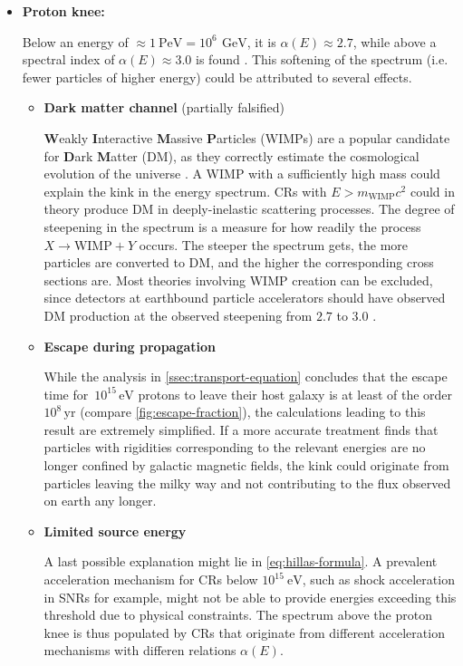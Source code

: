 \begin{itemize}
\item \textbf{Proton knee:}

Below an energy of $\approx \SI{1}{\peta\electronvolt} = 10^6\,\SI{}{\giga\electronvolt}$, it is $\alpha(E)\approx 2.7$, while above a spectral index of 
$\alpha(E)\approx 3.0$ is found \cite{gaisser2016cosmic}. This softening of the spectrum (i.e. fewer particles of higher energy) could be attributed to several
effects.

\begin{itemize}
	\item \textbf{Dark matter channel} (partially falsified)

	\textbf{W}eakly \textbf{I}nteractive \textbf{M}assive \textbf{P}articles (WIMPs) are a popular candidate for \textbf{D}ark \textbf{M}atter (DM), as they 
	correctly estimate the cosmological evolution of the universe \cite{klypin1993structure}. A WIMP with a sufficiently high mass could explain the kink in the 
	energy spectrum. CRs with $E > m_\text{WIMP}c^2$ could in theory produce DM in deeply-inelastic scattering processes. The degree of steepening in the spectrum 
	is a measure for how readily the process $X \rightarrow \text{WIMP} + Y$ occurs. The steeper the spectrum gets, the more particles are converted to DM, and the
	higher the corresponding cross sections are. Most theories involving WIMP creation can be excluded, since detectors at earthbound particle accelerators should 
	have observed DM production at the observed steepening from $2.7$ to $3.0$ \cite{donato2009constraints}.

	\item \textbf{Escape during propagation}

	While the analysis in \autoref{ssec:transport-equation} concludes that the escape time for $\,10^{15}\,\text{eV}$ protons to leave their host 	galaxy is at 
	least of the order ${10^{8}}\,\text{yr}$ (compare \autoref{fig:escape-fraction}), the calculations leading to this result are extremely simplified. If a more 
	accurate treatment finds that particles with rigidities corresponding to the relevant energies are no longer confined by galactic magnetic fields, the kink 
	could originate from particles leaving the milky way and not contributing to the flux observed on earth any longer.

	\item \textbf{Limited source energy}

	A last possible explanation might lie in \autoref{eq:hillas-formula}. A prevalent acceleration mechanism for CRs below $10^{15}\SI{}{\electronvolt}$, such as 
	shock acceleration in SNRs for example, might not be able to provide energies exceeding this threshold due to physical constraints. The spectrum above the 
	proton knee is thus populated by CRs that originate from different acceleration mechanisms with differen relations $\alpha(E)$.
\end{itemize}


\end{itemize}
